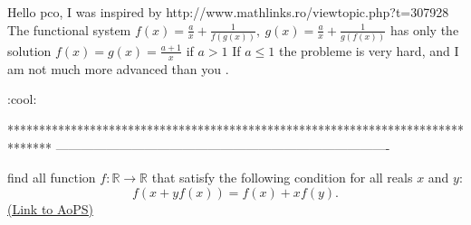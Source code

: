 \begin{solution}
	Hello pco,
 I was inspired  by http://www.mathlinks.ro/viewtopic.php?t=307928 
The functional system $ f(x) = \frac ax + \frac 1{f(g(x))},\ g(x) = \frac ax + \frac 1{g(f(x))}$ has only the solution $ f(x) = g(x) = \frac {a + 1}x$ if $ a > 1$
If $ a \leq 1$ the probleme is very hard, and I am not much more advanced than you .

 :cool:
\end{solution}
*******************************************************************************
-------------------------------------------------------------------------------

\begin{problem}
	find all function $ f: \mathbb R \to \mathbb R$ that satisfy the following condition for all reals $x$ and $y$:
\[f(x + yf(x)) = f(x) + xf(y).\]
	\flushright \href{https://artofproblemsolving.com/community/c6h311094}{(Link to AoPS)}
\end{problem}



